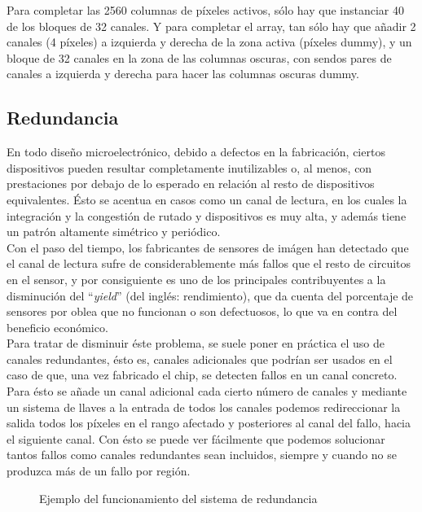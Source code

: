 Para completar las 2560 columnas de píxeles activos, sólo hay que instanciar 40
de los bloques de 32 canales. Y para completar el array, tan sólo hay que añadir
2 canales (4 píxeles) a izquierda y derecha de la zona activa (píxeles dummy), y
un bloque de 32 canales en la zona de las columnas oscuras, con sendos pares de
canales a izquierda y derecha para hacer las columnas oscuras dummy.\\

\subsection{Redundancia}

En todo diseño microelectrónico, debido a defectos en la fabricación, ciertos
dispositivos pueden resultar completamente inutilizables o, al menos, con prestaciones
por debajo de lo esperado en relación al resto de dispositivos equivalentes.
Ésto se acentua en casos como un canal de lectura, en los cuales la integración
y la congestión de rutado y dispositivos es muy alta, y además tiene un patrón
altamente simétrico y periódico.\\

Con el paso del tiempo, los fabricantes de sensores de imágen han detectado que
el canal de lectura sufre de considerablemente más fallos que el resto de circuitos
en el sensor, y por consiguiente es uno de los principales contribuyentes a la
disminución del ``\textit{yield}'' (del inglés: rendimiento), que da cuenta del
porcentaje de sensores por oblea que no funcionan o son defectuosos, lo que va
en contra del beneficio económico.\\

Para tratar de disminuir éste problema, se suele poner en práctica el uso de canales
redundantes, ésto es, canales adicionales que podrían ser usados en el caso de que,
una vez fabricado el chip, se detecten fallos en un canal concreto.\\

Para ésto se añade un canal adicional cada cierto número de canales y mediante un
sistema de llaves a la entrada de todos los canales podemos redireccionar la
salida todos los píxeles en el rango afectado y posteriores al canal del fallo,
hacia el siguiente canal. Con ésto se puede ver fácilmente que podemos solucionar
tantos fallos como canales redundantes sean incluidos, siempre y cuando no se
produzca más de un fallo por región.\\

\begin{figure}[h]
	
	\caption{Ejemplo del funcionamiento del sistema de redundancia}
	\label{fig:redundancy}
\end{figure}


